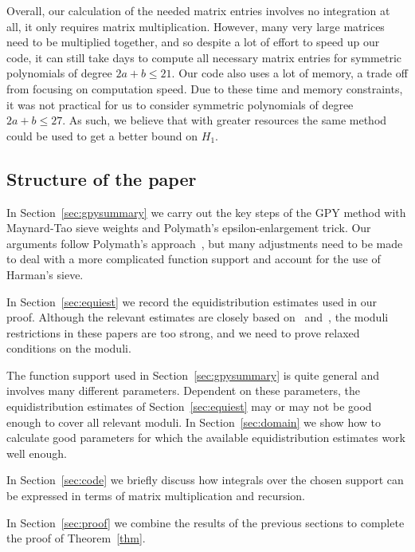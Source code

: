 \documentclass{amsart}
\numberwithin{equation}{section}
\begin{document}
 \medskip Overall, our calculation of the needed matrix entries involves no integration at all, it only requires matrix multiplication. However, many very large matrices need to be multiplied together, and so despite a lot of  effort  to speed up our code, it can still take   days to compute all necessary matrix entries for symmetric polynomials of degree $2a+b \leq 21$. Our code also uses a lot of memory, a trade off from focusing on computation speed. Due to these time and memory constraints, it was not practical for us  to consider symmetric polynomials of degree  $2a+b \leq 27$.  As such,  we believe that  with greater resources the same method could be used to get a better bound  on $H_1$.


\subsection{Structure of the paper} 

In Section~\ref{sec:gpysummary} we carry out the key steps of the GPY method with Maynard-Tao sieve weights and  Polymath's epsilon-enlargement trick. Our arguments  follow Polymath's approach~\cite{Polymath:2014:VSS}, but many adjustments need to be made   to deal with a more complicated function support and account for the use of  Harman's sieve. 

\smallskip

In Section~\ref{sec:equiest} we record the equidistribution estimates used in our proof. Although the relevant estimates are  closely based on~\cite{Polymath:2014:EDZ} and~\cite{Stadlmann:2023:PAP}, the moduli restrictions in these papers are too strong, and we need to prove relaxed conditions on the moduli. 

\smallskip

The function support used in Section~\ref{sec:gpysummary} is  quite general and involves many different parameters.   Dependent on these parameters, the  equidistribution estimates of Section~\ref{sec:equiest} may or may not be good enough to cover all relevant moduli. In Section~\ref{sec:domain} we show how to calculate good parameters for which the available  equidistribution estimates   work well enough.

\smallskip In Section~\ref{sec:code} we briefly discuss how integrals over the chosen support can be expressed in terms of matrix multiplication and recursion.  

\smallskip In Section~\ref{sec:proof} we combine the results of the previous sections to complete the proof of Theorem~\ref{thm}.
\end{document}
